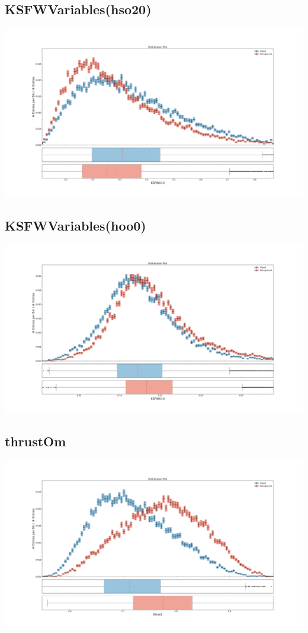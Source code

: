 \documentclass[10pt,a4paper]{article}
\begin{document}
\subsection{KSFWVariables(hso20)}
\begin{center}
\includegraphics[width=1.0\textwidth]{variable_59784006260187550.pdf}
\end{center}
\subsection{KSFWVariables(hoo0)}
\begin{center}
\includegraphics[width=1.0\textwidth]{variable_-6170714570052728149.pdf}
\end{center}
\subsection{thrustOm}
\begin{center}
\includegraphics[width=1.0\textwidth]{variable_8670119737831171811.pdf}
\end{center}
\end{document}
